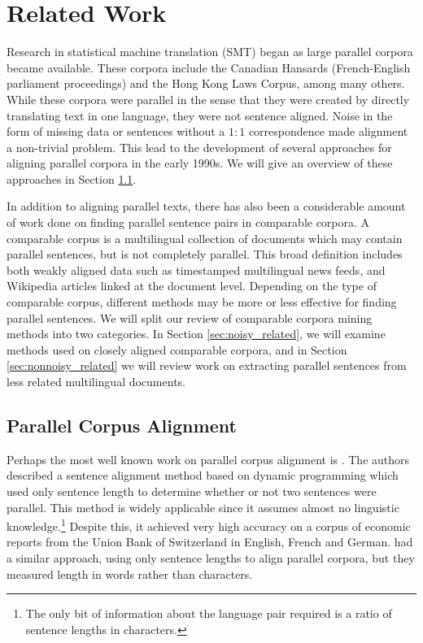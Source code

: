 \chapter{Related Work}
\label{chap:related_work}

Research in statistical machine translation (SMT) began as large parallel
corpora became available. These corpora include the Canadian Hansards
(French-English parliament proceedings) and the Hong Kong Laws Corpus, among many
others. While these corpora were parallel in the sense that they were created by
directly translating text in one language, they were not sentence aligned. Noise
in the form of missing data or sentences without a $1:1$ correspondence made
alignment a non-trivial problem. This lead to the development of several
approaches for aligning parallel corpora in the early 1990s. We will give an
overview of these approaches in Section \ref{sec:parallel_related}.

In addition to aligning parallel texts, there has also been a considerable
amount of work done on finding parallel sentence pairs in comparable corpora. A
comparable corpus is a multilingual collection of documents which may contain
parallel sentences, but is not completely parallel. This broad definition
includes both weakly aligned data such as timestamped multilingual news feeds,
and Wikipedia articles linked at the document level. Depending on the type of
comparable corpus, different methods may be more or less effective for finding
parallel sentences. We will split our review of comparable corpora mining
methods into two categories. In Section \ref{sec:noisy_related}, we will examine
methods used on closely aligned comparable corpora, and in Section
\ref{sec:nonnoisy_related} we will review work on extracting parallel sentences
from less related multilingual documents.

\section{Parallel Corpus Alignment}
\label{sec:parallel_related}

Perhaps the most well known work on parallel corpus alignment is \citet{Gale91,Gale93}.
The authors described a sentence alignment method based on dynamic programming
which used only sentence length to determine whether or not two sentences were
parallel. This method is widely applicable since it assumes almost no linguistic
knowledge.\footnote{The only bit of information about the language pair required
is a ratio of sentence lengths in characters.} Despite this, it achieved very
high accuracy on a corpus of economic reports from the Union Bank of Switzerland
in English, French and German. \citet{Brown91} had a similar approach, using
only sentence lengths to align parallel corpora, but they measured length in
words rather than characters.

